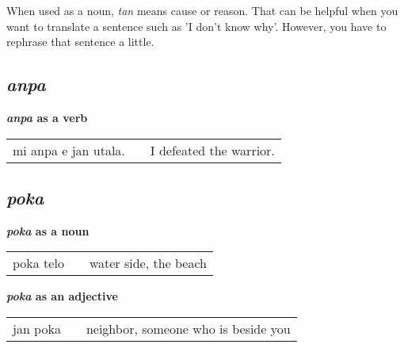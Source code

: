 When used as a noun, \textit{tan} means cause or reason. 
That can be helpful when you want to translate a sentence such as 'I don't know why'. 
However, you have to rephrase that sentence a little.
%
%

\subsection*{\textit{anpa}}
%
\textbf{\textit{anpa} as a verb} \\
\begin{supertabular}{p{5,5cm}|ll}
mi anpa e jan utala. && I defeated the warrior. \\
\end{supertabular} 
%
%
\subsection*{\textit{poka}}
\textbf{\textit{poka} as a noun} \\
\begin{supertabular}{p{5,5cm}|ll}
poka telo && water side, the beach \\
\end{supertabular} 

\textbf{\textit{poka} as an adjective} \\
\begin{supertabular}{p{5,5cm}|ll}
jan poka && neighbor, someone who is beside you \\
\end{supertabular} 
%
%
